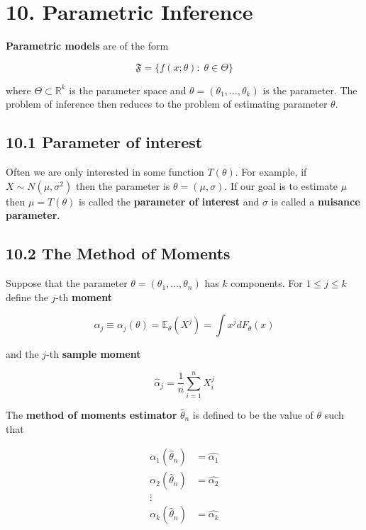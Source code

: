 \section{10. Parametric Inference}\label{parametric-inference}

\textbf{Parametric models} are of the form

\[ \mathfrak{F} = \bigg\{ f(x; \theta) : \; \theta \in \Theta \bigg\} \]

where \(\Theta \subset \mathbb{R}^k\) is the parameter space and
\(\theta = (\theta_1, \dots, \theta_k)\) is the parameter. The problem
of inference then reduces to the problem of estimating parameter
\(\theta\).

\subsection{10.1 Parameter of interest}\label{parameter-of-interest}

Often we are only interested in some function \(T(\theta)\). For
example, if \(X \sim N(\mu, \sigma^2)\) then the parameter is
\(\theta = (\mu, \sigma)\). If our goal is to estimate \(\mu\) then
\(\mu = T(\theta)\) is called the \textbf{parameter of interest} and
\(\sigma\) is called a \textbf{nuisance parameter}.

\subsection{10.2 The Method of Moments}\label{the-method-of-moments}

Suppose that the parameter \(\theta = (\theta_1, \dots, \theta_n)\) has
\(k\) components. For \(1 \leq j \leq k\) define the \(j\)-th
\textbf{moment}

\[ \alpha_j \equiv \alpha_j(\theta) = \mathbb{E}_\theta(X^j) = \int x^j dF_\theta(x)\]

and the \(j\)-th \textbf{sample moment}

\[ \hat{\alpha}_j = \frac{1}{n} \sum_{i=1}^n X_i^j \]

The \textbf{method of moments estimator} \(\hat{\theta}_n\) is defined
to be the value of \(\theta\) such that

\begin{align}
\alpha_1(\hat{\theta}_n) &= \hat{\alpha_1} \\
\alpha_2(\hat{\theta}_n) &= \hat{\alpha_2} \\
\vdots \\
\alpha_k(\hat{\theta}_n) &= \hat{\alpha_k}  
\end{align}

